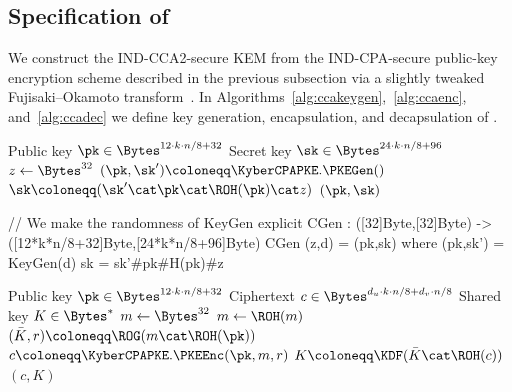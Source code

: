 \clearpage

\subsection{Specification of \KyberCCAKEM}
\label{subsec:specification:ccakem}

We construct the \KyberCCAKEM IND-CCA2-secure KEM from the IND-CPA-secure
public-key encryption scheme described in the previous subsection via a slightly
tweaked Fujisaki--Okamoto transform~\cite{C:FujOka99}. 
In Algorithms~\ref{alg:ccakeygen},~\ref{alg:ccaenc}, and~\ref{alg:ccadec}
we define key generation, encapsulation, and decapsulation of \KyberCCAKEM.

\begin{algorithm}
  \caption{$\KyberCCAKEM.\KEMGen()$
  \label{alg:ccakeygen}}
  \begin{algorithmic}[1]
    \Ensure Public key $\pk \in \Bytes^{12\cdot k\cdot n/8 + 32}$
    \Ensure Secret key $\sk \in \Bytes^{24\cdot k\cdot n/8 + 96}$
    \State $z \gets \Bytes^{32}$
    \State $(\pk,\sk') \coloneqq \KyberCPAPKE.\PKEGen()$
    \State $\sk \coloneqq (\sk'\cat \pk\cat \ROH(\pk)\cat z)$
    \State \Return $(\pk, \sk)$
  \end{algorithmic}
\end{algorithm}

\begin{code}
  // We make the randomness of KeyGen explicit
  CGen : ([32]Byte,[32]Byte) -> ([12*k*n/8+32]Byte,[24*k*n/8+96]Byte)
  CGen (z,d) = (pk,sk) where
    (pk,sk') = KeyGen(d)
    sk = sk'#pk#H(pk)#z
\end{code}

\begin{algorithm}
  \caption{$\KyberCCAKEM.\KEMEnc(\pk)$
  \label{alg:ccaenc}}
  \begin{algorithmic}[1]
    \Require Public key $\pk \in \Bytes^{12\cdot k\cdot n/8 + 32}$
    \Ensure Ciphertext $c \in \Bytes^{d_u\cdot k\cdot n/8 + d_v\cdot n/8}$
    \Ensure Shared key $K \in \Bytes^*$
    \State $m\gets \Bytes^{32}$\label{line:ccaenc:m}
    \State $m\gets \ROH(m)$
    \State $(\bar{K},r) \coloneqq \ROG(m\cat \ROH(\pk))$\label{line:ccaenc:r}
    \State $c \coloneqq \KyberCPAPKE.\PKEEnc(\pk, m, r)$
    \State $K \coloneqq \KDF(\bar{K}\cat \ROH(c))$\label{line:ccaenc:k}
    \State \Return $(c, K)$
  \end{algorithmic}
\end{algorithm}

